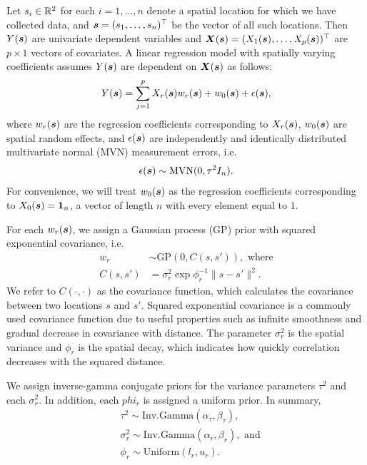 Let $s_i \in \mathbb{R}^2$ for each $i = 1, \dots, n$ denote a spatial location for which we have collected data, and $\boldsymbol{s} = (s_1, \dots, s_n)^\top$ be the vector of all such locations. Then $Y(\boldsymbol{s})$ are univariate dependent variables and $\boldsymbol{X}(\boldsymbol{s}) = (X_1(\boldsymbol{s}), \dots, X_p(\boldsymbol{s}))^\top$ are $p \times 1$ vectors of covariates. A linear regression model with spatially varying coefficients assumes $Y(\boldsymbol{s})$ are dependent on $\boldsymbol{X}(\boldsymbol{s})$ as follows:
\begin{align*}
    Y(\boldsymbol{s}) = \sum_{j=1}^p X_r(\boldsymbol{s})w_r(\boldsymbol{s}) + w_0(\boldsymbol{s}) + \epsilon(\boldsymbol{s}),
\end{align*}
where $w_r(\boldsymbol{s})$ are the regression coefficients corresponding to $X_r(\boldsymbol{s})$, $w_0(\boldsymbol{s})$ are spatial random effects, and $\epsilon(\boldsymbol{s})$ are independently and identically distributed multivariate normal (MVN) measurement errors, i.e.
\begin{align*}
    \epsilon(\boldsymbol{s}) \sim \text{MVN}(0, \tau^2 I_n).
\end{align*}
For convenience, we will treat $w_0(\boldsymbol{s})$ as the regression coefficients corresponding to $X_0(\boldsymbol{s}) = \mathbf{1}_n$, a vector of length $n$ with every element equal to $1$.

For each $w_r(\boldsymbol{s})$, we assign a Gaussian process (GP) prior with squared exponential covariance, i.e.
\begin{align*}
    w_r &\sim \text{GP}(0, C(s, s')), \text{ where}\\
    C(s, s') &= \sigma_r^2\exp{\phi_r^{-1}\|s-s'\|^2}.
\end{align*}
We refer to $C(\cdot, \cdot)$ as the covariance function, which calculates the covariance between two locations $s$ and $s'$. Squared exponential covariance is a commonly used covariance function due to useful properties such as infinite smoothness and gradual decrease in covariance with distance. The parameter $\sigma_r^2$ is the spatial variance and $\phi_r$ is the spatial decay, which indicates how quickly correlation decreases with the squared distance.

We assign inverse-gamma conjugate priors for the variance parameters $\tau^2$ and each $\sigma_r^2$. In addition, each $phi_r$ is assigned a uniform prior. In summary,
\begin{align*}
    & \tau^2 \sim \text{Inv.Gamma}(\alpha_\tau, \beta_\tau),\\
    & \sigma_r^2 \sim \text{Inv.Gamma}(\alpha_r, \beta_r), \text{ and}\\
    & \phi_r \sim \text{Uniform}(l_r, u_r).
\end{align*}

